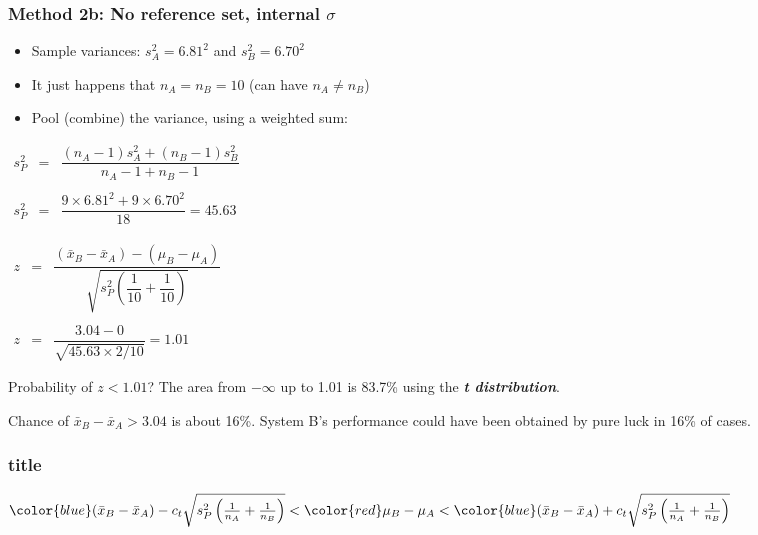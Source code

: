 \begin{frame}\frametitle{Method 2b: No reference set, internal $\sigma$}
	\begin{itemize}
		\item	Sample variances: $s_A^2 = 6.81^2$ and $s_B^2 = 6.70^2$
		\item	It just happens that $n_A = n_B = 10$ (can have $n_A \neq n_B$)
		\item	Pool (combine) the variance, using a weighted sum:
	\end{itemize}

	$
	\begin{array}{rcccl}
		s_P^2 &=& \dfrac{(n_A -1) s_A^2 + (n_B-1)s_B^2}{n_A - 1 + n_B - 1} \\ \\ 
		s_P^2 &=& \dfrac{9\times 6.81^2 + 9 \times 6.70^2}{18} = 45.63
	\end{array}
	$

	\vspace{8pt}
	$
	\begin{array}{rcccl}
		z &=& \dfrac{\left(\bar{x}_B - \bar{x}_A\right)- (\mu_B - \mu_A)}{\sqrt{s_P^2 \left(\dfrac{1}{10} + \dfrac{1}{10}\right)}} \\
		\\
		z &=& \dfrac{3.04 - 0}{\sqrt{45.63 \times 2/10}} = 1.01
	\end{array}
	$
	
	
	\vspace{8pt}
	Probability of $z < 1.01$? The area from $-\infty$ up to 1.01 is 83.7\% using the \textbf{\emph{t distribution}}.

	Chance of $\bar{x}_B - \bar{x}_A > 3.04$ is about 16\%. System B's performance could have been obtained by pure luck in 16\% of cases.
\end{frame}

\begin{frame}\frametitle{title}
	\vspace{10pt}
	{${\color{blue} (\bar{x}_B - \bar{x}_A) - c_t \sqrt{s_P^2 \left(\tfrac{1}{n_A} + \tfrac{1}{n_B}\right)}  } < {\color{red} \mu_B - \mu_A} < {\color{blue} (\bar{x}_B - \bar{x}_A) + c_t \sqrt{s_P^2 \left(\tfrac{1}{n_A} + \tfrac{1}{n_B} \right)} }$}
	
\end{frame}

